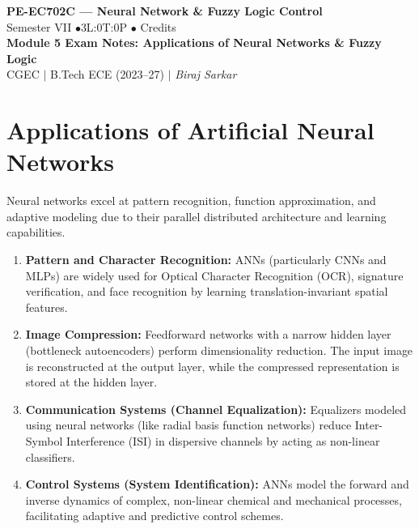 \documentclass[12pt,a4paper]{article}
\begin{document}

\begin{center}
  {\LARGE\bfseries\color{myred} PE-EC702C --- Neural Network \& Fuzzy Logic Control}\\[5pt]
  {\normalsize\color{mydark} Semester VII \quad$\bullet$\quad 3L:0T:0P \quad$\bullet$ Credits}\\[3pt]
  {\normalsize\color{myteal}\textbf{Module 5 Exam Notes: Applications of Neural Networks \& Fuzzy Logic}}\\[3pt]
  {\small\color{mydark} CGEC \;$|$\; B.Tech ECE (2023--27) \;$|$\; \textit{Biraj Sarkar}}
\end{center}
\vspace{2pt}
\noindent{\color{myred}\rule{\linewidth}{1.5pt}}
\vspace{2pt}

\hypersetup{linkcolor=mydark}
\tableofcontents
\hypersetup{linkcolor=myteal}
\newpage

\section{Applications of Artificial Neural Networks}

Neural networks excel at pattern recognition, function approximation, and adaptive modeling due to their parallel distributed architecture and learning capabilities.

\begin{enumerate}[leftmargin=*, itemsep=4pt]
  \item \textbf{Pattern and Character Recognition:} ANNs (particularly CNNs and MLPs) are widely used for Optical Character Recognition (OCR), signature verification, and face recognition by learning translation-invariant spatial features.
  \item \textbf{Image Compression:} Feedforward networks with a narrow hidden layer (bottleneck autoencoders) perform dimensionality reduction. The input image is reconstructed at the output layer, while the compressed representation is stored at the hidden layer.
  \item \textbf{Communication Systems (Channel Equalization):} Equalizers modeled using neural networks (like radial basis function networks) reduce Inter-Symbol Interference (ISI) in dispersive channels by acting as non-linear classifiers.
  \item \textbf{Control Systems (System Identification):} ANNs model the forward and inverse dynamics of complex, non-linear chemical and mechanical processes, facilitating adaptive and predictive control schemes.
\end{enumerate}
\end{document}
